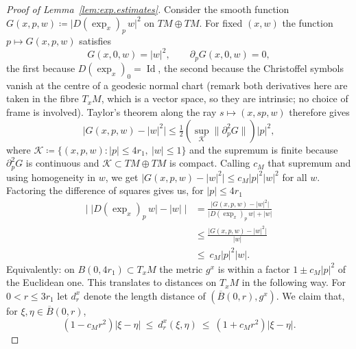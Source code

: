 \documentclass[10pt,a4paper]{amsart}
\DeclareMathOperator{\Id}{Id}
\begin{document}
\begin{proof}[Proof of Lemma~\ref{lem:exp.estimates}]
    Consider the smooth function \(G(x,p,w)\coloneqq \big\lvert D(\exp_x)_p\,w\big\rvert^2\) on \(TM \oplus TM\).
    For fixed \( (x,w) \) the function \( p\mapsto G(x,p,w) \) satisfies
    \[
        G(x,0,w)=\lvert w\rvert^2,\qquad \partial_pG(x,0,w)=0 ,
    \]
    the first because \( D(\exp_x)_0=\Id \), the second because the Christoffel symbols vanish at the centre of a geodesic normal chart (remark both derivatives here are taken in the fibre \( T_xM \), which is a vector space, so they are intrinsic; no choice of frame is involved).  
    Taylor's theorem along the ray \( s\mapsto(x,sp,w) \) therefore gives
    \[
        \big\lvert G(x,p,w)-\lvert w\rvert^2\big\rvert
        \le\tfrac12\left(\sup_{\mathcal K}\big\lVert\partial^2_pG\big\rVert\right)\lvert p\rvert^2 ,
    \]
    where \(\mathcal K\coloneqq \{(x,p,w):\lvert p\rvert\le4r_1,\ \lvert w\rvert\le1\}\) and the supremum is finite because \( \partial^2_pG \) is continuous and \( \mathcal K\subset TM\oplus TM \) is compact.  
    Calling \( c_M \) that supremum and using homogeneity in \( w \), we get \( \big\lvert G(x,p,w)-\lvert w\rvert^2\big\rvert\le c_M\lvert p\rvert^2\lvert w\rvert^2 \) for all \( w \).
    Factoring the difference of squares gives us, for \(\lvert p\rvert\le4r_1\)
    \begin{equation}\label{eq:infinitesimal.comparison}
    \begin{split}
        \Big\lvert\;\big\lvert D(\exp_x)_p\,w\big\rvert-\lvert w\rvert\;\Big\rvert &= \frac{\big\lvert G(x,p,w)-\lvert w\rvert^2\big\rvert}{\big\lvert D(\exp_x)_p\,w\big\rvert+\lvert w\rvert}\\
        &\le \frac{\big\lvert G(x,p,w)-\lvert w\rvert^2\big\rvert}{\lvert w\rvert} \\ &\le\ c_M\lvert p\rvert^2\lvert w\rvert. 
    \end{split}
    \end{equation}
    Equivalently: on \( B(0,4r_1)\subset T_xM \) the metric \( g^x \) is within a factor \( 1\pm c_M\lvert p\rvert^2 \) of the Euclidean one. 
    This translates to distances on \(T_xM\) in the following way.
    For \( 0<r\le3r_1 \) let \( d^x_r \) denote the length distance of \( \left(\overline B(0,r),g^x\right) \).
    We claim that, for \( \xi,\eta\in\overline B(0,r) \),
    \begin{equation}\label{eq:ball.comparison}
        \left(1-c_Mr^2\right)\lvert\xi-\eta\rvert
        \ \le\ d^x_r(\xi,\eta)
        \ \le\ \left(1+c_Mr^2\right)\lvert\xi-\eta\rvert .
    \end{equation}

\end{proof}
\end{document}
